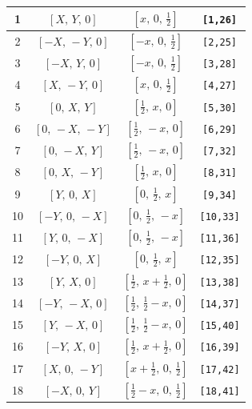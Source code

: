 \documentclass[fleqn,8pt]{jsarticle}
\begin{document}
\begin{longtable}{cccc}
1 & $\left[ X,\, Y,\, 0 \right]$ & $\left[ x,\, 0,\, \frac{1}{2} \right]$ & {\tt [1,26]} \\ \hline
2 & $\left[ - X,\, - Y,\, 0 \right]$ & $\left[ - x,\, 0,\, \frac{1}{2} \right]$ & {\tt [2,25]} \\ \hline
3 & $\left[ - X,\, Y,\, 0 \right]$ & $\left[ - x,\, 0,\, \frac{1}{2} \right]$ & {\tt [3,28]} \\ \hline
4 & $\left[ X,\, - Y,\, 0 \right]$ & $\left[ x,\, 0,\, \frac{1}{2} \right]$ & {\tt [4,27]} \\ \hline
5 & $\left[ 0,\, X,\, Y \right]$ & $\left[ \frac{1}{2},\, x,\, 0 \right]$ & {\tt [5,30]} \\ \hline
6 & $\left[ 0,\, - X,\, - Y \right]$ & $\left[ \frac{1}{2},\, - x,\, 0 \right]$ & {\tt [6,29]} \\ \hline
7 & $\left[ 0,\, - X,\, Y \right]$ & $\left[ \frac{1}{2},\, - x,\, 0 \right]$ & {\tt [7,32]} \\ \hline
8 & $\left[ 0,\, X,\, - Y \right]$ & $\left[ \frac{1}{2},\, x,\, 0 \right]$ & {\tt [8,31]} \\ \hline
9 & $\left[ Y,\, 0,\, X \right]$ & $\left[ 0,\, \frac{1}{2},\, x \right]$ & {\tt [9,34]} \\ \hline
10 & $\left[ - Y,\, 0,\, - X \right]$ & $\left[ 0,\, \frac{1}{2},\, - x \right]$ & {\tt [10,33]} \\ \hline
11 & $\left[ Y,\, 0,\, - X \right]$ & $\left[ 0,\, \frac{1}{2},\, - x \right]$ & {\tt [11,36]} \\ \hline
12 & $\left[ - Y,\, 0,\, X \right]$ & $\left[ 0,\, \frac{1}{2},\, x \right]$ & {\tt [12,35]} \\ \hline
13 & $\left[ Y,\, X,\, 0 \right]$ & $\left[ \frac{1}{2},\, x + \frac{1}{2},\, 0 \right]$ & {\tt [13,38]} \\ \hline
14 & $\left[ - Y,\, - X,\, 0 \right]$ & $\left[ \frac{1}{2},\, \frac{1}{2} - x,\, 0 \right]$ & {\tt [14,37]} \\ \hline
15 & $\left[ Y,\, - X,\, 0 \right]$ & $\left[ \frac{1}{2},\, \frac{1}{2} - x,\, 0 \right]$ & {\tt [15,40]} \\ \hline
16 & $\left[ - Y,\, X,\, 0 \right]$ & $\left[ \frac{1}{2},\, x + \frac{1}{2},\, 0 \right]$ & {\tt [16,39]} \\ \hline
17 & $\left[ X,\, 0,\, - Y \right]$ & $\left[ x + \frac{1}{2},\, 0,\, \frac{1}{2} \right]$ & {\tt [17,42]} \\ \hline
18 & $\left[ - X,\, 0,\, Y \right]$ & $\left[ \frac{1}{2} - x,\, 0,\, \frac{1}{2} \right]$ & {\tt [18,41]} \\ \hline

\end{longtable}
\end{document}
